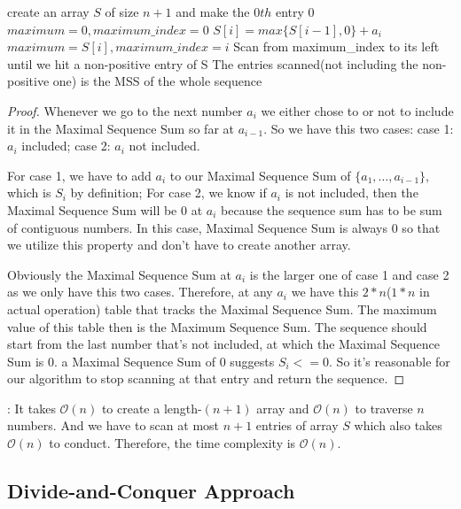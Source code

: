 \documentclass[11pt]{article}
\renewcommand{\O}{\mathcal{O}}
\begin{document}

\begin{algorithm}
\begin{algorithmic}
  \State create an array $S$ of size $n+1$ and make the $0th$ entry $0$
  \State $maximum = 0, maximum\_index = 0$
    \State $S[i] = max\{S[i-1], 0\} + a_i$
      \State $maximum = S[i], maximum\_index = i$
    \EndIf
  \EndFor
  \State Scan from maximum\_index to its left until we hit a non-positive entry of S
  \State The entries scanned(not including the non-positive one) is the MSS of the whole sequence
\end{algorithmic}
\end{algorithm}

\begin{proof}
Whenever we go to the next number $a_i$ we either chose to or not to include it in the Maximal Sequence Sum so far at $a_{i-1}$. So we have this two cases: case 1: $a_i$ included; case 2: $a_i$ not included.

For case 1, we have to add $a_i$ to our Maximal Sequence Sum of $\{a_1, \dots, a_{i-1}\}$, which is $S_i$ by definition; For case 2, we know if $a_i$ is not included, then the Maximal Sequence Sum will be $0$ at $a_i$ because the sequence sum has to be sum of contiguous numbers. In this case, Maximal Sequence Sum is always $0$ so that we utilize this property and don't have to create another array.

Obviously the Maximal Sequence Sum at $a_i$ is the larger one of case 1 and case 2 as we only have this two cases. Therefore, at any $a_i$ we have this $2*n$($1*n$ in actual operation) table that tracks the Maximal Sequence Sum. The maximum value of this table then is the Maximum Sequence Sum. The sequence should start from the last number that's not included, at which the Maximal Sequence Sum is $0$. a Maximal Sequence Sum of $0$ suggests $S_i <= 0$. So it's reasonable for our algorithm to stop scanning at that entry and return the sequence.
\end{proof}

: It takes $\O(n)$ to create a length-$(n+1)$ array and $\O(n)$ to traverse $n$ numbers. And we have to scan at most $n+1$ entries of array $S$ which also takes $\O(n)$ to conduct. Therefore, the time complexity is $\O(n)$.

\subsection{Divide-and-Conquer Approach}
\end{document}

